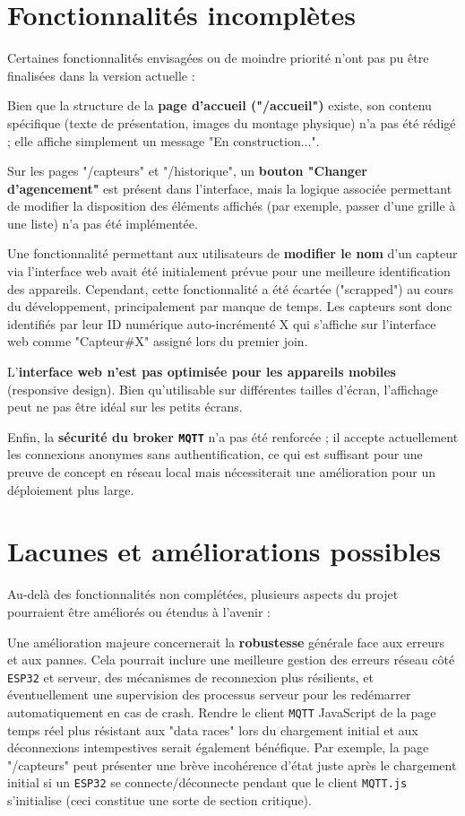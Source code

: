 \documentclass[12pt]{article}
\begin{document}
\section{Fonctionnalités incomplètes}

Certaines fonctionnalités envisagées ou de moindre priorité n'ont pas pu être finalisées dans la version actuelle :

Bien que la structure de la \textbf{page d'accueil ("/accueil")} existe, son contenu spécifique (texte de présentation, images du montage physique) n'a pas été rédigé ; elle affiche simplement un message "En construction...".

Sur les pages "/capteurs" et "/historique", un \textbf{bouton "Changer d'agencement"} est présent dans l'interface, mais la logique associée permettant de modifier la disposition des éléments affichés (par exemple, passer d'une grille à une liste) n'a pas été implémentée.

Une fonctionnalité permettant aux utilisateurs de \textbf{modifier le nom} d'un capteur via l'interface web avait été initialement prévue pour une meilleure identification des appareils. Cependant, cette fonctionnalité a été écartée ("scrapped") au cours du développement, principalement par manque de temps. Les capteurs sont donc identifiés par leur ID numérique auto-incrémenté X qui s'affiche sur l'interface web comme "Capteur\#X" assigné lors du premier join.

L'\textbf{interface web n'est pas optimisée pour les appareils mobiles} (responsive design). Bien qu'utilisable sur différentes tailles d'écran, l'affichage peut ne pas être idéal sur les petits écrans.

Enfin, la \textbf{sécurité du broker \texttt{MQTT}} n'a pas été renforcée ; il accepte actuellement les connexions anonymes sans authentification, ce qui est suffisant pour une preuve de concept en réseau local mais nécessiterait une amélioration pour un déploiement plus large.

\section{Lacunes et améliorations possibles}

Au-delà des fonctionnalités non complétées, plusieurs aspects du projet pourraient être améliorés ou étendus à l'avenir :

Une amélioration majeure concernerait la \textbf{robustesse} générale face aux erreurs et aux pannes. Cela pourrait inclure une meilleure gestion des erreurs réseau côté \texttt{ESP32} et serveur, des mécanismes de reconnexion plus résilients, et éventuellement une supervision des processus serveur pour les redémarrer automatiquement en cas de crash. Rendre le client \texttt{MQTT} JavaScript de la page temps réel plus résistant aux "data races" lors du chargement initial et aux déconnexions intempestives serait également bénéfique. Par exemple, la page "/capteurs" peut présenter une brève incohérence d'état juste après le chargement initial si un \texttt{ESP32} se connecte/déconnecte pendant que le client \texttt{MQTT.js} s'initialise (ceci constitue une sorte de section critique).
\end{document}
